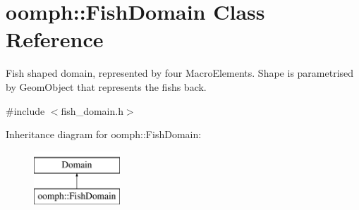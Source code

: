 \hypertarget{classoomph_1_1FishDomain}{}\section{oomph\+:\+:Fish\+Domain Class Reference}
\label{classoomph_1_1FishDomain}


Fish shaped domain, represented by four Macro\+Elements. Shape is parametrised by Geom\+Object that represents the fish\textquotesingle{}s back.  




{\ttfamily \#include $<$fish\+\_\+domain.\+h$>$}

Inheritance diagram for oomph\+:\+:Fish\+Domain\+:\begin{figure}[H]
\begin{center}
\leavevmode
\includegraphics[height=2.000000cm]{classoomph_1_1FishDomain}
\end{center}
\end{figure}
